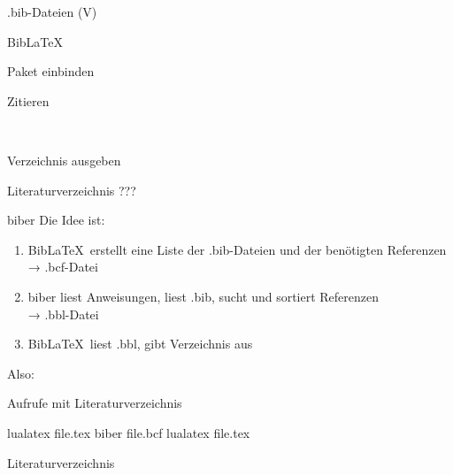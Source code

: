 \begin{frame}{.bib-Dateien (V)}
  \bibexamplev
\end{frame}

\begin{frame}[fragile]{Bib\LaTeX}
  \begin{block}{Paket einbinden}
    \begin{lstverbatim}
    \usepackage[backend=biber]{biblatex} %
    
    \end{lstverbatim}
  \end{block}
  \begin{block}{Zitieren}
      \begin{minipage}{0.6\linewidth}
        \begin{lstverbatim}
        \cite{numpy}
        \cite{splot,root}
        \end{lstverbatim}
      \end{minipage}
      \begin{minipage}{0.35\linewidth}
        \cite{numpy}\\
        \cite{splot,root}
      \end{minipage}
  \end{block}
  \begin{block}{Verzeichnis ausgeben}
    \begin{lstverbatim}
    \nocite{anleitung01} %
    \nocite{*}           %
    \printbibliography
    \end{lstverbatim}
  \end{block}
\end{frame}

\begin{frame}{Literaturverzeichnis}
  \centering
  \pause
  \Huge ???
\end{frame}

\begin{frame}[fragile]{biber}
  Die Idee ist:
  \begin{enumerate}
    \item Bib\LaTeX\ erstellt eine Liste der .bib-Dateien und der benötigten Referenzen\\
          → .bcf-Datei
    \item biber liest Anweisungen, liest .bib, sucht und sortiert Referenzen\\
          → .bbl-Datei
    \item Bib\LaTeX\ liest .bbl, gibt Verzeichnis aus
  \end{enumerate}

  \vspace{10pt}
  Also:
  \begin{block}{Aufrufe mit Literaturverzeichnis}
    \begin{lstverbatim}
     lualatex file.tex
     biber file.bcf
     lualatex file.tex
    \end{lstverbatim}
  \end{block}
\end{frame}

\begin{frame}{Literaturverzeichnis}
  \nocite{*}
  \printbibliography[heading=none]
\end{frame}

